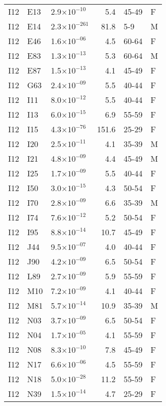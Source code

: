 \begin{longtable}{lllrll}
   I12 & E13 & 2.9$\times10^{-10}$ & 5.4 & 45-49 & F \\ 
   I12 & E14 & 2.3$\times10^{-261}$ & 81.8 & 5-9 & M \\ 
   I12 & E46 & 1.6$\times10^{-06}$ & 4.5 & 60-64 & F \\ 
   I12 & E83 & 1.3$\times10^{-13}$ & 5.3 & 60-64 & M \\ 
   I12 & E87 & 1.5$\times10^{-13}$ & 4.1 & 45-49 & F \\ 
   I12 & G63 & 2.4$\times10^{-09}$ & 5.5 & 40-44 & F \\ 
   I12 & I11 & 8.0$\times10^{-12}$ & 5.5 & 40-44 & F \\ 
   I12 & I13 & 6.0$\times10^{-15}$ & 6.9 & 55-59 & F \\ 
   I12 & I15 & 4.3$\times10^{-76}$ & 151.6 & 25-29 & F \\ 
   I12 & I20 & 2.5$\times10^{-11}$ & 4.1 & 35-39 & M \\ 
   I12 & I21 & 4.8$\times10^{-09}$ & 4.4 & 45-49 & M \\ 
   I12 & I25 & 1.7$\times10^{-09}$ & 5.5 & 40-44 & F \\ 
   I12 & I50 & 3.0$\times10^{-15}$ & 4.3 & 50-54 & F \\ 
   I12 & I70 & 2.8$\times10^{-09}$ & 6.6 & 35-39 & M \\ 
   I12 & I74 & 7.6$\times10^{-12}$ & 5.2 & 50-54 & F \\ 
   I12 & I95 & 8.8$\times10^{-14}$ & 10.7 & 45-49 & F \\ 
   I12 & J44 & 9.5$\times10^{-07}$ & 4.0 & 40-44 & F \\ 
   I12 & J90 & 4.2$\times10^{-09}$ & 6.5 & 50-54 & F \\ 
   I12 & L89 & 2.7$\times10^{-09}$ & 5.9 & 55-59 & F \\ 
   I12 & M10 & 7.2$\times10^{-09}$ & 4.1 & 40-44 & F \\ 
   I12 & M81 & 5.7$\times10^{-14}$ & 10.9 & 35-39 & M \\ 
   I12 & N03 & 3.7$\times10^{-09}$ & 6.5 & 50-54 & F \\ 
   I12 & N04 & 1.7$\times10^{-05}$ & 4.1 & 55-59 & F \\ 
   I12 & N08 & 8.3$\times10^{-10}$ & 7.8 & 45-49 & F \\ 
   I12 & N17 & 6.6$\times10^{-06}$ & 4.5 & 55-59 & F \\ 
   I12 & N18 & 5.0$\times10^{-28}$ & 11.2 & 55-59 & F \\ 
   I12 & N39 & 1.5$\times10^{-14}$ & 4.7 & 25-29 & F \\ 

\end{longtable}
